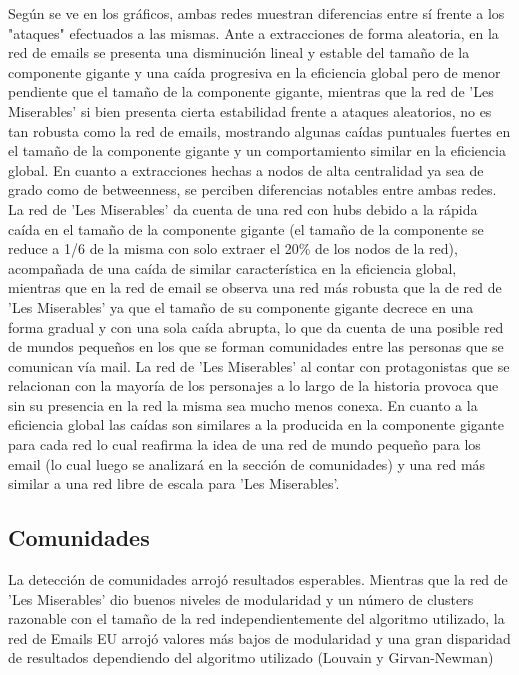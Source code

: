 \documentclass[conference]{IEEEtran}
\begin{document}
Según se ve en los gráficos, ambas redes muestran diferencias entre sí frente a los "ataques" efectuados a las mismas. Ante a extracciones de forma aleatoria, en la red de emails se presenta una disminución lineal y estable del tamaño de la componente gigante y una caída progresiva en la eficiencia global pero de menor pendiente que el tamaño de la componente gigante, mientras que la red de 'Les Miserables' si bien presenta cierta estabilidad frente a ataques aleatorios, no es tan robusta como la red de emails, mostrando algunas caídas puntuales fuertes en el tamaño de la componente gigante y un comportamiento similar en la eficiencia global. En cuanto a extracciones hechas a nodos de alta centralidad ya sea de grado como de betweenness, se perciben diferencias notables entre ambas redes. La red de 'Les Miserables' da cuenta de una red con hubs debido a la rápida caída en el tamaño de la componente gigante (el tamaño de la componente se reduce a 1/6 de la misma con solo extraer el 20\% de los nodos de la red), acompañada de una caída de similar característica en la eficiencia global, mientras que en la red de email se observa una red más robusta que la de red de 'Les Miserables' ya que el tamaño de su componente gigante decrece en una forma gradual y con una sola caída abrupta, lo que da cuenta de una posible red de mundos pequeños en los que se forman comunidades entre las personas que se comunican vía mail. La red de 'Les Miserables' al contar con protagonistas que se relacionan con la mayoría de los personajes a lo largo de la historia provoca que sin su presencia en la red la misma sea mucho menos conexa. En cuanto a la eficiencia global las caídas son similares a la producida en la componente gigante para cada red lo cual reafirma la idea de una red de mundo pequeño para los email (lo cual luego se analizará en la sección de comunidades) y una red más similar a una red libre de escala para 'Les Miserables'.

\vspace{5pt}

\subsection{Comunidades}

La detección de comunidades arrojó resultados esperables. Mientras que la red de 'Les Miserables' dio buenos niveles de modularidad y un número de clusters razonable con el tamaño de la red independientemente del algoritmo utilizado, la red de Emails EU arrojó valores más bajos de modularidad y una gran disparidad de resultados dependiendo del algoritmo utilizado (Louvain y Girvan-Newman)
\end{document}
